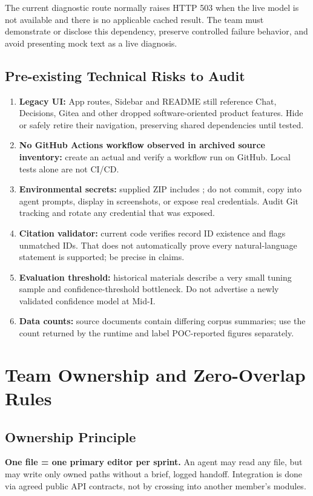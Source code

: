 \documentclass[11pt,a4paper,oneside]{report}
\newcommand{\file}[1]{\path{#1}}
\begin{document}
The current diagnostic route normally raises HTTP 503 when the live model is not available and there is no applicable cached result. The team must demonstrate or disclose this dependency, preserve controlled failure behavior, and avoid presenting mock text as a live diagnosis.

\section{Pre-existing Technical Risks to Audit}
\begin{enumerate}
\item \textbf{Legacy UI:} App routes, Sidebar and README still reference Chat, Decisions, Gitea and other dropped software-oriented product features. Hide or safely retire their navigation, preserving shared dependencies until tested.
\item \textbf{No GitHub Actions workflow observed in archived source inventory:} create an actual \file{.github/workflows/ci.yml} and verify a workflow run on GitHub. Local tests alone are not CI/CD.
\item \textbf{Environmental secrets:} supplied ZIP includes \file{backend/.env}; do not commit, copy into agent prompts, display in screenshots, or expose real credentials. Audit Git tracking and rotate any credential that was exposed.
\item \textbf{Citation validator:} current code verifies record ID existence and flags unmatched IDs. That does not automatically prove every natural-language statement is supported; be precise in claims.
\item \textbf{Evaluation threshold:} historical materials describe a very small tuning sample and confidence-threshold bottleneck. Do not advertise a newly validated confidence model at Mid-I.
\item \textbf{Data counts:} source documents contain differing corpus summaries; use the count returned by the runtime and label POC-reported figures separately.
\end{enumerate}

\chapter{Team Ownership and Zero-Overlap Rules}
\section{Ownership Principle}
\textbf{One file = one primary editor per sprint.} An agent may read any file, but may write only owned paths without a brief, logged handoff. Integration is done via agreed public API contracts, not by crossing into another member's modules.
\end{document}
